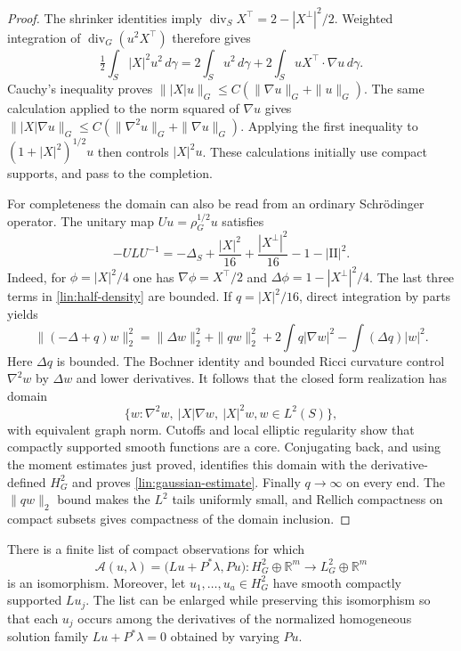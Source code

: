 \begin{proof}
The shrinker identities imply
$\operatorname{div}_S X^\top=2-|X^\perp|^2/2$.  Weighted integration of
$\operatorname{div}_G(u^2X^\top)$ therefore gives
\[
 \tfrac12\int_S |X|^2u^2\,d\gamma
 =2\int_Su^2\,d\gamma+2\int_SuX^\top\cdot\nabla u\,d\gamma.
\]
Cauchy's inequality proves
$\||X|u\|_G\le C(\|\nabla u\|_G+\|u\|_G)$.
The same calculation applied to the norm squared of $\nabla u$ gives
$\||X|\nabla u\|_G\le C(\|\nabla^2u\|_G+\|\nabla u\|_G)$.
Applying the first inequality to $(1+|X|^2)^{1/2}u$ then controls
$|X|^2u$.  These calculations initially use compact supports, and pass to
the completion.

For completeness the domain can also be read from an ordinary
Schr\"odinger operator.  The unitary map $Uu=\rho_G^{1/2}u$ satisfies
\begin{equation}\label{lin:half-density}
 -ULU^{-1}=-\Delta_S+\frac{|X|^2}{16}
       +\frac{|X^\perp|^2}{16}-1-|\mathrm{II}|^2.
\end{equation}
Indeed, for $\phi=|X|^2/4$ one has
$\nabla\phi=X^\top/2$ and $\Delta\phi=1-|X^\perp|^2/4$.
The last three terms in \eqref{lin:half-density} are bounded.
If $q=|X|^2/16$, direct integration by parts yields
\[
 \|(-\Delta+q)w\|_2^2
 =\|\Delta w\|_2^2+\|qw\|_2^2
       +2\int q|\nabla w|^2-\int(\Delta q)|w|^2.
\]
Here $\Delta q$ is bounded.  The Bochner identity and bounded Ricci
curvature control $\nabla^2w$ by $\Delta w$ and lower derivatives.
It follows that the closed form realization has domain
\[
 \{w:\nabla^2w,\ |X|\nabla w,\ |X|^2w,w\in L^2(S)\},
\]
with equivalent graph norm.  Cutoffs and local elliptic regularity show
that compactly supported smooth functions are a core.  Conjugating back,
and using the moment estimates just proved, identifies this domain with
the derivative-defined $H^2_G$ and proves
\eqref{lin:gaussian-estimate}.  Finally $q\to\infty$ on every end.
The $\|qw\|_2$ bound makes the $L^2$ tails uniformly small, and Rellich
compactness on compact subsets gives compactness of the domain inclusion.
\end{proof}

\begin{lemma}\label{lin:observations}
There is a finite list of compact observations for which
\begin{equation}\label{lin:augmented}
 \mathcal A(u,\lambda)
    =\bigl(Lu+P^*\lambda,Pu\bigr):
 H^2_G\oplus\mathbb R^m\longrightarrow L^2_G\oplus\mathbb R^m
\end{equation}
is an isomorphism.  Moreover, let $u_1,\ldots,u_a\in H^2_G$ have
smooth compactly supported $Lu_j$.  The list can be enlarged while preserving
this isomorphism so that each $u_j$ occurs among the derivatives of the
normalized homogeneous solution family
$Lu+P^*\lambda=0$ obtained by varying $Pu$.
\end{lemma}

